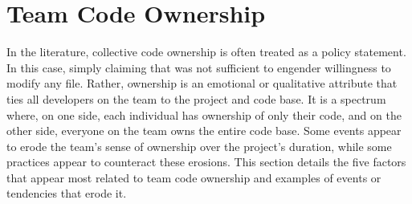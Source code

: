 

\section{Team Code Ownership}
\label{TeamCodeOwnership}

In the literature, collective code ownership is often treated as a policy statement. In this case, simply claiming that  was not sufficient to engender willingness to modify any file. Rather, ownership is an emotional or qualitative attribute that ties all developers on the team to the project and code base. It is a spectrum where, on one side, each individual has ownership of only their code, and on the other side, everyone on the team owns the entire code base. Some events appear to erode the team's sense of ownership over the project's duration, while some practices appear to counteract these erosions. This section details the five factors that appear most related to team code ownership and examples of events or tendencies that erode it. 

